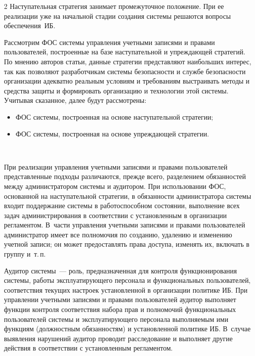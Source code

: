 \begin{multicols}{2}
       Наступательная стратегия занимает промежуточное положение. При ее 
реализации уже на начальной стадии создания сис\-те\-мы решаются вопросы 
обеспечения~ИБ. 
       
       Рассмотрим ФОС сис\-те\-мы 
       управ\-ле\-ния учетными записями и правами пользователей, построенные на базе 
наступательной и упреждающей стратегий. По мнению авторов статьи, данные\linebreak
 страте\-гии 
представляют наибольших интерес, так как позволяют разработчикам сис\-те\-мы 
безопас\-ности и службе безопас\-ности организации адекватно реальным условиям и 
требованиям выстраивать методы и средства защиты и формировать организацию и 
технологии этой сис\-те\-мы. Учитывая сказанное, далее будут рассмотрены:
       \begin{itemize}
\item ФОС сис\-те\-мы, построенная на основе 
наступательной стратегии;
\item ФОС сис\-те\-мы, построенная на основе упреж\-да\-ющей стратегии.
\end{itemize}

\begin{figure}[b] %
\vspace*{9pt}
 \begin{center}
 \mbox{%
 \epsfxsize=159.191mm
 }
 \end{center}
 \vspace*{-9pt}
\end{figure}

       При реализации управления учетными записями и правами пользователей 
представленные подходы различаются, прежде всего, разделением обязанностей между 
администратором сис\-те\-мы и аудито\-ром. При использовании 
ФОС, основанной на наступательной стратегии, в обязанности 
администратора сис\-те\-мы входит поддержание сис\-те\-мы в работоспособном со\-сто\-я\-нии, 
выполнение всех задач администрирования в соответствии с уста\-нов\-лен\-ным в 
организации регламентом. В~час\-ти управ\-ле\-ния учетными записями и правами 
пользователей администратор имеет все полномочия по созданию, удалению и изменению 
учетной записи; он может предостав\-лять права доступа, изменять их, включать в группу 
и~т.\,п.
       
       Аудитор системы~--- роль, предназначенная для контроля функционирования 
сис\-те\-мы, работы эксплуатирующего персонала и функциональных пользователей, 
соответствия текущих настроек уста\-нов\-лен\-ной в организации политике ИБ. При 
управлении учетными записями и правами пользователей аудитор выполняет функции 
контроля соответствия набора прав и полномочий функциональных пользователей 
сис\-те\-мы и эксплуатирующего персонала выполняемым ими функциям (должностным 
обязанностям) и уста\-нов\-лен\-ной политике ИБ. В~случае выявления нарушений аудитор 
проводит расследование и выполняет другие действия в соответствии с уста\-нов\-лен\-ным 
регламентом.
       

\end{multicols}
